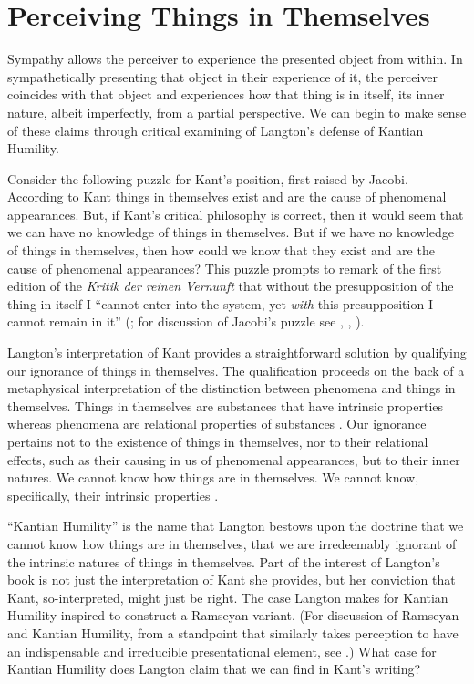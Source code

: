 
\section{Perceiving Things in Themselves} %
\label{sec:perceiving_things_in_themselves}

Sympathy allows the perceiver to experience the presented object from within. In sympathetically presenting that object in their experience of it, the perceiver coincides with that object and experiences how that thing is in itself, its inner nature, albeit imperfectly, from a partial perspective. We can begin to make sense of these claims through critical examining of Langton's \citeyearpar{Langton:1998aa} defense of Kantian Humility.

Consider the following puzzle for Kant's position, first raised by Jacobi. According to Kant things in themselves exist and are the cause of phenomenal appearances. But, if Kant's critical philosophy is correct, then it would seem that we can have no knowledge of things in themselves. But if we have no knowledge of things in themselves, then how could we know that they exist and are the cause of phenomenal appearances? This puzzle prompts \citet[304]{Jacobi:1815bs} to remark of the first edition of the \emph{Kritik der reinen Vernunft} that without the presupposition of the thing in itself I ``cannot enter into the system, yet \emph{with} this presupposition I cannot remain in it'' (\citealt[335]{Guyer:1987xe}; for discussion of Jacobi's puzzle see \citealt[247--54]{Allison:1983ly}, \citealt[chapter 15]{Guyer:1987xe}, \citealt[chapter 1]{Langton:1998aa}).

Langton's interpretation of Kant provides a straightforward solution by qualifying our ignorance of things in themselves. The qualification proceeds on the back of a metaphysical interpretation of the distinction between phenomena and things in themselves. Things in themselves are substances that have intrinsic properties whereas phenomena are relational properties of substances \citep[20]{Langton:1998aa}. Our ignorance pertains not to the existence of things in themselves, nor to their relational effects, such as their causing in us of phenomenal appearances, but to their inner natures. We cannot know how things are in themselves. We cannot know, specifically, their intrinsic properties \citep[13]{Langton:1998aa}. 

``Kantian Humility'' is the name that Langton bestows upon the doctrine that we cannot know how things are in themselves, that we are irredeemably ignorant of the intrinsic natures of things in themselves. Part of the interest of Langton's book is not just the interpretation of Kant she provides, but her conviction that Kant, so-interpreted, might just be right. The case Langton makes for Kantian Humility inspired \citet{Lewis:2009ax} to construct a Ramseyan variant. (For discussion of Ramseyan and Kantian Humility, from a standpoint that similarly takes perception to have an indispensable and irreducible presentational element, see \citealt{Brewer:2011ks}.) What case for Kantian Humility does Langton claim that we can find in Kant's writing?

